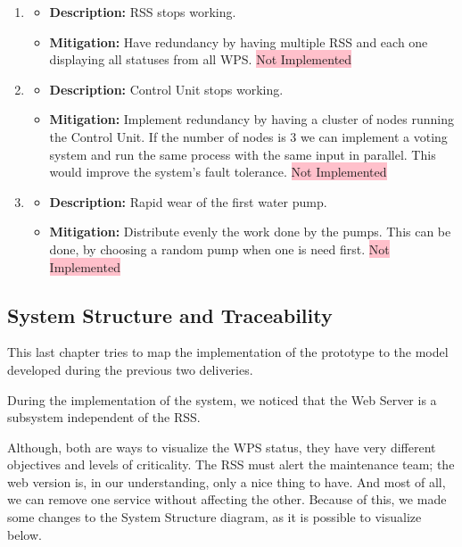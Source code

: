 \documentclass[11pt]{article}
\begin{document}
\begin{enumerate}[leftmargin=4em, font=\small, label=\textbf{H-\arabic*:}]
\begin{itemize}
		\end{itemize} 
	\item 
		\begin{itemize}
		\setlength\itemsep{0em}
    		\item \textbf{Description:} RSS stops working.
    		\item \textbf{Mitigation:} Have redundancy by having multiple RSS and each one displaying all statuses from all WPS. \colorbox{pink}{Not Implemented} 
		\end{itemize} 
	\item 
		\begin{itemize}
		\setlength\itemsep{0em}
    		\item \textbf{Description:} Control Unit stops working.
    		\item \textbf{Mitigation:} Implement redundancy by having a cluster of nodes running the Control Unit. If the number of nodes is 3 we can implement a voting system and run the same process with the same input in parallel. This would improve the system's fault tolerance. \colorbox{pink}{Not Implemented} 
		\end{itemize} 
	\item
		\begin{itemize}
		\setlength\itemsep{0em}
    		\item \textbf{Description:} Rapid wear of the first water pump.
    		\item \textbf{Mitigation:}  Distribute evenly the work done by the pumps. This can be done, by choosing a random pump when one is need first. \colorbox{pink}{Not Implemented} 
		\end{itemize} 
\end{enumerate}

\subsection{System Structure and Traceability}

This last chapter tries to map the implementation of the prototype to the model developed during the previous two deliveries.

During the implementation of the system, we noticed that the Web Server is a subsystem independent of the RSS. 

Although, both are ways to visualize the WPS status, they have very different objectives and levels of criticality. The RSS must alert the maintenance team; the web version is, in our understanding, only a nice thing to have. And most of all, we can remove one service without affecting the other. Because of this, we made some changes to the System Structure diagram, as it is possible to visualize below.
\end{document}
